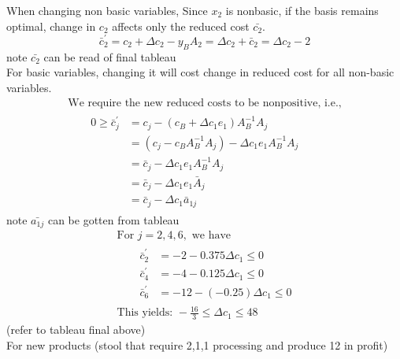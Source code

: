 \documentclass{article}
\begin{document}
When changing non basic variables,
Since $x_2$ is nonbasic, if the basis remains optimal, change in $c_2$
affects only the reduced cost $\bar {c_2}$.
$$
\bar { c } _ { 2 } ^ { \prime } = c _ { 2 } + \Delta c _ { 2 } - y _ { B } A _ { 2 } = \Delta c _ { 2 } + \bar { c } _ { 2 } = \Delta c _ { 2 } - 2
$$
note $\bar{c_2}$ can be read of final tableau\\
For basic variables, changing it will cost change in reduced cost for all non-basic variables.\\
$$
\begin{array} { l } { \text { We require the new reduced costs to be nonpositive, i.e., } } \\ { \qquad \begin{aligned} 0 \geqslant \bar { c } _ { j } ^ { \prime } & = c _ { j } - \left( c _ { B } + \Delta c _ { 1 } e _ { 1 } \right) A _ { B } ^ { - 1 } A _ { j } \\ & = \left( c _ { j } - c _ { B } A _ { B } ^ { - 1 } A _ { j } \right) - \Delta c _ { 1 } e _ { 1 } A _ { B } ^ { - 1 } A _ { j } \\ & = \bar { c } _ { j } - \Delta c _ { 1 } e _ { 1 } A _ { B } ^ { - 1 } A _ { j } \\ & = \bar { c } _ { j } - \Delta c _ { 1 } e _ { 1 } \bar { A } _ { j } \\ & = \bar { c } _ { j } - \Delta c _ { 1 } \bar { a } _ { 1 j } \end{aligned} } \end{array}
$$
note $\bar{a_{1j}}$ can be gotten from tableau
$$
\begin{array} { l } { \text { For } j = 2,4,6 , \text { we have } } \\ { \qquad \begin{aligned} \bar { c } _ { 2 } ^ { \prime } & = - 2 - 0.375 \Delta c _ { 1 } \leqslant 0 \\ \bar { c } _ { 4 } ^ { \prime } & = - 4 - 0.125 \Delta c _ { 1 } \leqslant 0 \\ \bar { c } _ { 6 } ^ { \prime } & = - 12 - ( - 0.25 ) \Delta c _ { 1 } \leqslant 0 \end{aligned} } \\ { \text { This yields: } - \frac { 16 } { 3 } \leqslant \Delta c _ { 1 } \leqslant 48 } \end{array}
$$
(refer to tableau final above)\\
For new products (stool that require 2,1,1 processing and produce 12 in profit)
\end{document}
